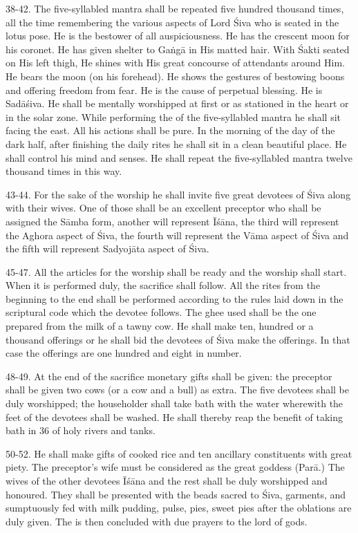 38-42. The five-syllabled mantra shall be repeated five hundred thousand times,
all the time remembering the various aspects of Lord Śiva who is seated in
the lotus pose. He is the bestower of all auspiciousness. He has the crescent
moon for his coronet. He has given shelter to Gaṅgā in His matted hair. With
Śakti seated on His left thigh, He shines with His great concourse of attendants
around Him. He bears the moon (on his forehead). He shows the gestures of
bestowing boons and offering freedom from fear. He is the cause of perpetual
blessing. He is Sadāśiva. He shall be mentally worshipped at first or as
stationed in the heart or in the solar zone. While performing the  of
the five-syllabled mantra he shall sit facing the east. All his actions shall
be pure. In the morning of the  day of the dark half, after
finishing the daily rites he shall sit in a clean beautiful place. He shall
control his mind and senses. He shall repeat the five-syllabled mantra twelve
thousand times in this way.

43-44. For the sake of the worship he shall invite five great devotees of Śiva
along with their wives. One of those shall be an excellent preceptor who shall
be assigned the Sāmba form, another will represent Īśāna, the third will
represent the Aghora aspect of Śiva, the fourth will represent the Vāma aspect
of Śiva and the fifth will represent Sadyojāta aspect of Śiva.

45-47. All the articles for the worship shall be ready and the worship shall
start. When it is performed duly, the sacrifice shall follow. All the rites from
the beginning to the end shall be performed according to the rules laid down in
the scriptural code which the devotee follows. The ghee used shall be the one
prepared from the milk of a tawny cow. He shall make ten, hundred or a thousand
offerings or he shall bid the devotees of Śiva make the offerings. In that case
the offerings are one hundred and eight in number.

48-49. At the end of the sacrifice monetary gifts shall be given: the preceptor
shall be given two cows (or a cow and a bull) as extra. The five devotees shall
be duly worshipped; the householder shall take bath with the water wherewith
the feet of the devotees shall be washed. He shall thereby reap the benefit of
taking bath in 36  of holy rivers and tanks.

50-52. He shall make gifts of cooked rice and ten ancillary constituents with
great piety. The preceptor’s wife must be considered as the great goddess
(Parā.) The wives of the other devotees Īśāna and the rest shall be duly
worshipped and honoured. They shall be presented with the beads sacred to Śiva,
garments, and sumptuously fed with milk pudding, pulse, pies, sweet pies \etc
after the oblations are duly given. The  is then concluded with due
prayers to the lord of gods.

